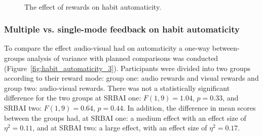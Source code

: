 \documentclass{scaffold/sigchi}
\begin{document}
\begin{figure}
  \centering
  \caption{The effect of rewards on habit automaticity.}~\label{fig:habit_automaticity_2}
\end{figure}

\subsubsection{Multiple vs. single-mode feedback on habit automaticity}
To compare the effect audio-visual had on automaticity a one-way between-groups analysis of variance with planned comparisons was conducted (Figure~\ref{fig:habit_automaticity_3}). Participants were divided into two groups according to their reward mode: group one: audio rewards and visual rewards and group two: audio-visual rewards. There was not a
statistically significant difference for the two groups at SRBAI one: $ F(1,9) = 1.04$, $p = 0.33$, and SRBAI two: $F(1,9) = 0.64$, $p = 0.44$. In addition, the difference in mean scores between the groups had, at SRBAI one: a medium effect with an effect size of $\eta^{2} = 0.11$, and at SRBAI two: a large effect, with an effect size of $\eta^{2} = 0.17$.
\end{document}
